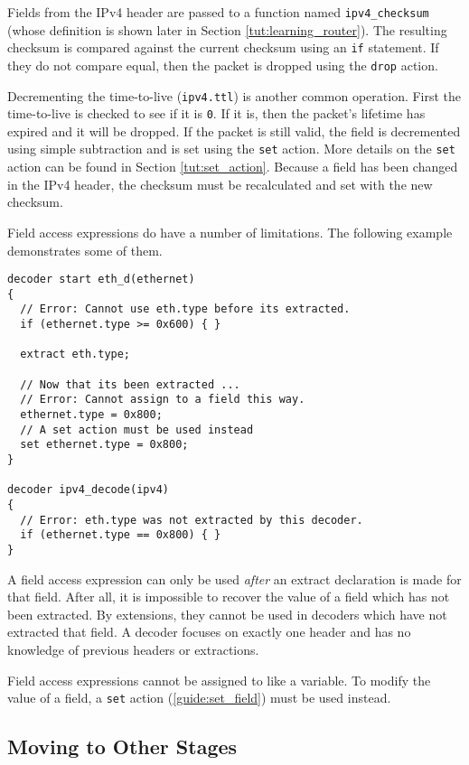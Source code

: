 Fields from the IPv4 header are passed to a function named \texttt{ipv4\_checksum} (whose definition is shown later in Section \ref{tut:learning_router}). The resulting checksum is compared against the current checksum using an \texttt{if} statement. If they do not compare equal, then the packet is dropped using the \texttt{drop} action.

Decrementing the time-to-live (\texttt{ipv4.ttl}) is another common operation. First the time-to-live is checked to see if it is \texttt{0}. If it is, then the packet's lifetime has expired and it will be dropped. If the packet is still valid, the field is decremented using simple subtraction and is set using the \texttt{set} action. More details on the \texttt{set} action can be found in Section \ref{tut:set_action}. Because a field has been changed in the IPv4 header, the checksum must be recalculated and set with the new checksum.

Field access expressions do have a number of limitations. The following example
demonstrates some of them.

\begin{codepage}
\begin{lstlisting}
decoder start eth_d(ethernet)
{
  // Error: Cannot use eth.type before its extracted.
  if (ethernet.type >= 0x600) { }

  extract eth.type;

  // Now that its been extracted ...
  // Error: Cannot assign to a field this way.
  ethernet.type = 0x800;
  // A set action must be used instead
  set ethernet.type = 0x800;
}

decoder ipv4_decode(ipv4)
{
  // Error: eth.type was not extracted by this decoder.
  if (ethernet.type == 0x800) { }
}
\end{lstlisting}
\end{codepage}

A field access expression can only be used \textit{after} an extract declaration
is made for that field. After all, it is impossible to recover the value of a
field which has not been extracted. By extensions, they cannot be used in
decoders which have not extracted that field. A decoder focuses on exactly one
header and has no knowledge of previous headers or extractions.

Field access expressions cannot be assigned to like a variable. To modify the
value of a field, a \texttt{set} action (\ref{guide:set_field}) must be used instead.

\subsection{Moving to Other Stages} \label{tut:decoder_next}

